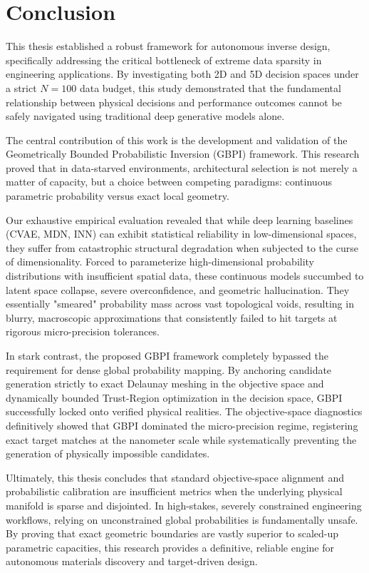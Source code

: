 \section{Conclusion}\label{sec:conclusion}

This thesis established a robust framework for autonomous inverse design, specifically addressing the critical bottleneck of extreme data sparsity in engineering applications. By investigating both 2D and 5D decision spaces under a strict $N=100$ data budget, this study demonstrated that the fundamental relationship between physical decisions and performance outcomes cannot be safely navigated using traditional deep generative models alone. 

The central contribution of this work is the development and validation of the Geometrically Bounded Probabilistic Inversion (GBPI) framework. This research proved that in data-starved environments, architectural selection is not merely a matter of capacity, but a choice between competing paradigms: continuous parametric probability versus exact local geometry. 

Our exhaustive empirical evaluation revealed that while deep learning baselines (CVAE, MDN, INN) can exhibit statistical reliability in low-dimensional spaces, they suffer from catastrophic structural degradation when subjected to the curse of dimensionality. Forced to parameterize high-dimensional probability distributions with insufficient spatial data, these continuous models succumbed to latent space collapse, severe overconfidence, and geometric hallucination. They essentially "smeared" probability mass across vast topological voids, resulting in blurry, macroscopic approximations that consistently failed to hit targets at rigorous micro-precision tolerances.

In stark contrast, the proposed GBPI framework completely bypassed the requirement for dense global probability mapping. By anchoring candidate generation strictly to exact Delaunay meshing in the objective space and dynamically bounded Trust-Region optimization in the decision space, GBPI successfully locked onto verified physical realities. The objective-space diagnostics definitively showed that GBPI dominated the micro-precision regime, registering exact target matches at the nanometer scale while systematically preventing the generation of physically impossible candidates.

Ultimately, this thesis concludes that standard objective-space alignment and probabilistic calibration are insufficient metrics when the underlying physical manifold is sparse and disjointed. In high-stakes, severely constrained engineering workflows, relying on unconstrained global probabilities is fundamentally unsafe. By proving that exact geometric boundaries are vastly superior to scaled-up parametric capacities, this research provides a definitive, reliable engine for autonomous materials discovery and target-driven design.